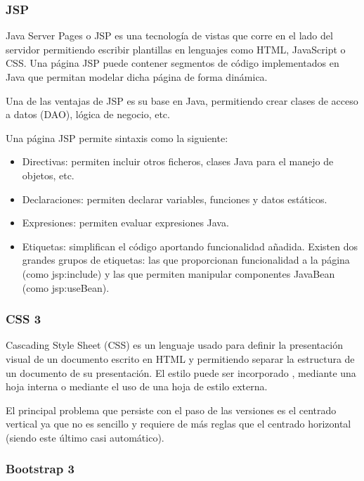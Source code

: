 \subsubsection{JSP}
Java Server Pages o JSP es una tecnología de vistas que corre en el lado del servidor permitiendo escribir plantillas en lenguajes como HTML, JavaScript o CSS. Una página JSP puede contener segmentos de código implementados en Java que permitan modelar dicha página de forma dinámica.

Una de las ventajas de JSP es su base en Java, permitiendo crear clases de acceso a datos (DAO), lógica de negocio, etc.

Una página JSP permite sintaxis como la siguiente:

\begin{itemize}
	\item Directivas: permiten incluir otros ficheros, clases Java para el manejo de objetos, etc.
	\item Declaraciones: permiten declarar variables, funciones y datos estáticos.
	\item Expresiones: permiten evaluar expresiones Java.
	\item Etiquetas: simplifican el código aportando funcionalidad añadida. Existen dos grandes grupos de etiquetas: las que proporcionan funcionalidad a la página (como jsp:include) y las que permiten manipular componentes JavaBean (como jsp:useBean).
	
\end{itemize}

\subsubsection{CSS 3}
Cascading Style Sheet (CSS) es un lenguaje usado para definir la presentación visual de un documento escrito en HTML y  permitiendo separar la estructura de un documento de su presentación. El estilo puede ser incorporado , mediante una hoja interna o mediante el uso de una hoja de estilo externa.

El principal problema que persiste con el paso de las versiones es el centrado vertical ya que no es sencillo y requiere de más reglas que el centrado horizontal (siendo este último casi automático).

\subsubsection{Bootstrap 3}

